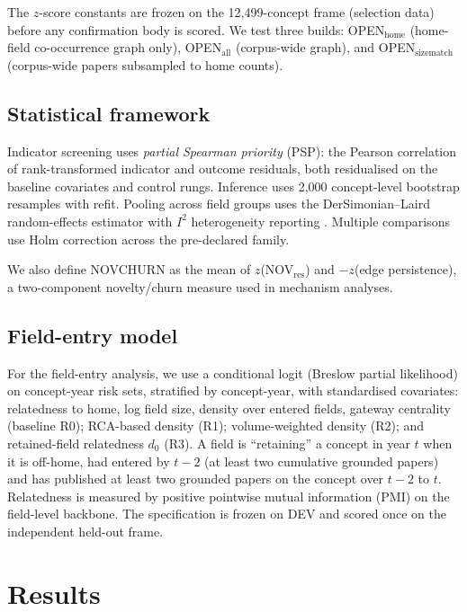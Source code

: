 \documentclass[11pt,letterpaper]{article}
\begin{document}
The $z$-score constants are frozen on the 12{,}499-concept frame (selection data) before any confirmation body is scored. We test three builds: OPEN$_{\text{home}}$ (home-field co-occurrence graph only), OPEN$_{\text{all}}$ (corpus-wide graph), and OPEN$_{\text{sizematch}}$ (corpus-wide papers subsampled to home counts).

\subsection{Statistical framework}

Indicator screening uses \emph{partial Spearman priority} (PSP): the Pearson correlation of rank-transformed indicator and outcome residuals, both residualised on the baseline covariates and control rungs. Inference uses 2{,}000 concept-level bootstrap resamples with refit. Pooling across field groups uses the DerSimonian--Laird random-effects estimator \citep{Dersimonian1986} with $I^2$ heterogeneity reporting \citep{Higgins2002}. Multiple comparisons use Holm correction across the pre-declared family.

We also define NOVCHURN as the mean of $z$(NOV$_{\text{res}}$) and $-z$(edge persistence), a two-component novelty/churn measure used in mechanism analyses.

\subsection{Field-entry model}

For the field-entry analysis, we use a conditional logit (Breslow partial likelihood) on concept-year risk sets, stratified by concept-year, with standardised covariates: relatedness to home, log field size, density over entered fields, gateway centrality (baseline R0); RCA-based density (R1); volume-weighted density (R2); and retained-field relatedness $d_0$ (R3). A field is ``retaining'' a concept in year $t$ when it is off-home, had entered by $t-2$ (at least two cumulative grounded papers) and has published at least two grounded papers on the concept over $t-2$ to $t$. Relatedness is measured by positive pointwise mutual information (PMI) on the field-level backbone. The specification is frozen on DEV and scored once on the independent held-out frame.


\section{Results}
\label{sec:results}
\end{document}
